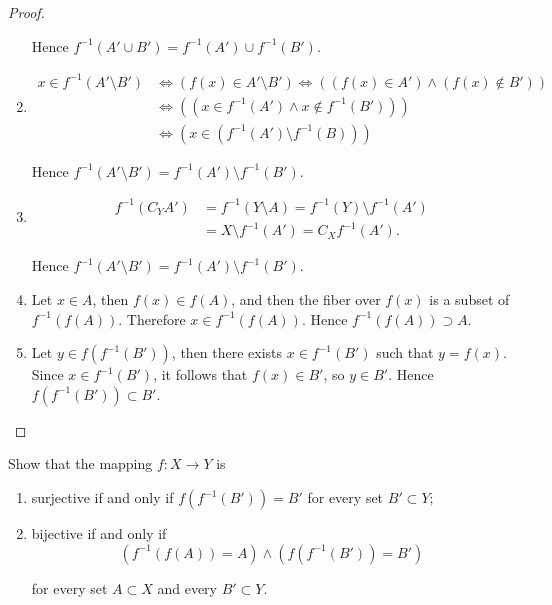 \begin{proof}
\begin{enumerate}[label={(\alph*)}]
              Hence $f^{-1}(A'\cup B') = f^{-1}(A')\cup f^{-1}(B')$.
        \item \begin{align*}
                  x\in f^{-1}(A'\setminus B') & \Leftrightarrow (f(x)\in A'\setminus B') \Leftrightarrow ((f(x)\in A') \land (f(x)\notin B')) \\
                                              & \Leftrightarrow ((x\in f^{-1}(A') \land x\notin f^{-1}(B')))                                  \\
                                              & \Leftrightarrow (x\in (f^{-1}(A')\setminus f^{-1}(B)))
              \end{align*}

              Hence $f^{-1}(A'\setminus B') = f^{-1}(A')\setminus f^{-1}(B')$.
        \item \begin{align*}
                  f^{-1}(C_{Y}A') & = f^{-1}(Y\setminus A) = f^{-1}(Y)\setminus f^{-1}(A') \\
                                  & = X\setminus f^{-1}(A') = C_{X}f^{-1}(A').
              \end{align*}

              Hence $f^{-1}(A'\setminus B') = f^{-1}(A')\setminus f^{-1}(B')$.
        \item Let $x\in A$, then $f(x)\in f(A)$, and then the fiber over $f(x)$ is a subset of $f^{-1}(f(A))$. Therefore $x\in f^{-1}(f(A))$. Hence $f^{-1}(f(A))\supset A$.
        \item Let $y\in f(f^{-1}(B'))$, then there exists $x\in f^{-1}(B')$ such that $y = f(x)$. Since $x\in f^{-1}(B')$, it follows that $f(x)\in B'$, so $y\in B'$. Hence $f(f^{-1}(B'))\subset B'$.
    \end{enumerate}
\end{proof}
\newpage

\begin{exercise}
    Show that the mapping $f: X \to Y$ is
    \begin{enumerate}[label={(\alph*)}]
        \item surjective if and only if $f(f^{-1}(B')) = B'$ for every set $B'\subset Y$;
        \item bijective if and only if
              \[
                  \left(f^{-1}(f(A)) = A\right) \land \left( f(f^{-1}(B')) = B' \right)
              \]

              for every set $A\subset X$ and every $B'\subset Y$.
    \end{enumerate}
\end{exercise}

